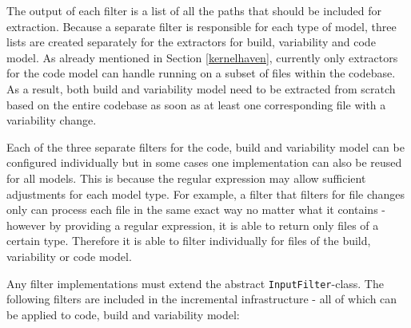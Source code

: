 \documentclass[a4paper]{article}
\begin{document}
The output of each filter is a list of all the paths that should be included for extraction. Because a separate filter is responsible for each type of model, three lists are created separately for the extractors for build, variability and code model. As already mentioned in Section \ref{kernelhaven}, currently only extractors for the code model can handle running on a subset of files within the codebase. As a result, both build and variability model need to be extracted from scratch based on the entire codebase as soon as at least one corresponding file with a variability change.

Each of the three separate filters for the code, build and variability model can be configured individually but in some cases one implementation can also be reused for all models. This is because the regular expression may allow sufficient adjustments for each model type. For example, a filter that filters for file changes only can process each file in the same exact way no matter what it contains - however by providing a regular expression, it is able to return only files of a certain type. Therefore it is able to filter individually for files of the build, variability or code model.

 Any filter implementations must extend the abstract \texttt{InputFilter}-class. The following filters are included in the incremental infrastructure - all of which can be applied to code, build and variability model:
\end{document}
